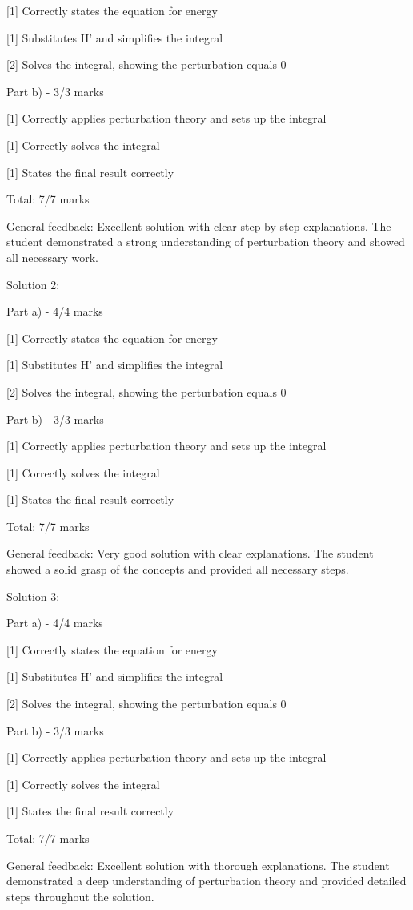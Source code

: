 \documentclass[a4paper,11pt]{article}
\begin{document}
[1] Correctly states the equation for energy

[1] Substitutes H' and simplifies the integral

[2] Solves the integral, showing the perturbation equals 0

Part b) - 3/3 marks

[1] Correctly applies perturbation theory and sets up the integral

[1] Correctly solves the integral

[1] States the final result correctly

Total: 7/7 marks

General feedback: Excellent solution with clear step-by-step explanations. The student demonstrated a strong understanding of perturbation theory and showed all necessary work.

Solution 2:

Part a) - 4/4 marks

[1] Correctly states the equation for energy

[1] Substitutes H' and simplifies the integral

[2] Solves the integral, showing the perturbation equals 0

Part b) - 3/3 marks

[1] Correctly applies perturbation theory and sets up the integral

[1] Correctly solves the integral

[1] States the final result correctly

Total: 7/7 marks

General feedback: Very good solution with clear explanations. The student showed a solid grasp of the concepts and provided all necessary steps.

Solution 3:

Part a) - 4/4 marks

[1] Correctly states the equation for energy

[1] Substitutes H' and simplifies the integral

[2] Solves the integral, showing the perturbation equals 0

Part b) - 3/3 marks

[1] Correctly applies perturbation theory and sets up the integral

[1] Correctly solves the integral

[1] States the final result correctly

Total: 7/7 marks

General feedback: Excellent solution with thorough explanations. The student demonstrated a deep understanding of perturbation theory and provided detailed steps throughout the solution.
\end{document}
